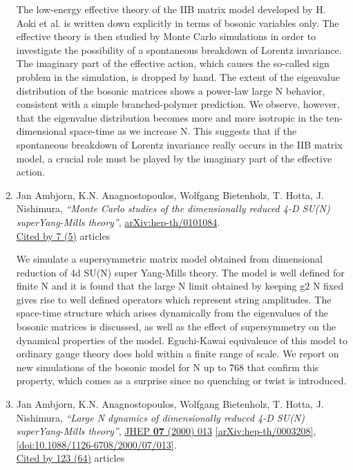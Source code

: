 \documentclass[a4paper,10pt]{article}
\begin{document}
\begin{enumerate}
The low-energy effective theory of the IIB matrix model developed by H. Aoki et al. is written down explicitly in terms of bosonic variables only. The effective theory is then studied by Monte Carlo simulations in order to investigate the possibility of a spontaneous breakdown of Lorentz invariance. The imaginary part of the effective action, which causes the so-called sign problem in the simulation, is dropped by hand. The extent of the eigenvalue distribution of the bosonic matrices shows a power-law large N behavior, consistent with a simple branched-polymer prediction. We observe, however, that the eigenvalue distribution becomes more and more isotropic in the ten-dimensional space-time as we increase N. This suggests that if the spontaneous breakdown of Lorentz invariance really occurs in the IIB matrix model, a crucial role must be played by the imaginary part of the effective action.
\item Jan Ambjorn, K.N. Anagnostopoulos, Wolfgang Bietenholz, T. Hotta, J. Nishimura, {\it ``Monte Carlo studies of the dimensionally reduced 4-D SU(N) superYang-Mills theory''}, \href{https://arxiv.org/abs/hep-th/0101084}{arXiv:hep-th/0101084}.
\\\href{https://inspirehep.net/literature/?q=refersto%3Arecid%3A539882}{Cited by 7 (5)} articles

We simulate a supersymmetric matrix model obtained from dimensional reduction of 4d SU(N) super Yang-Mills theory. The model is well defined for finite N and it is found that the large N limit obtained by keeping g2 N fixed gives rise to well defined operators which represent string amplitudes. The space-time structure which arises dynamically from the eigenvalues of the bosonic matrices is discussed, as well as the effect of supersymmetry on the dynamical properties of the model. Eguchi-Kawai equivalence of this model to ordinary gauge theory does hold within a finite range of scale. We report on new simulations of the bosonic model for N up to 768 that confirm this property, which comes as a surprise since no quenching or twist is introduced.
\item Jan Ambjorn, K.N. Anagnostopoulos, Wolfgang Bietenholz, T. Hotta, J. Nishimura, {\it ``Large N dynamics of dimensionally reduced 4-D SU(N) superYang-Mills theory''}, \href{https://www.doi.org/10.1088/1126-6708/2000/07/013}{JHEP {\bf 07} (2000) 013} \href{https://arxiv.org/abs/hep-th/0003208}{[arXiv:hep-th/0003208]}, \href{https://www.doi.org/10.1088/1126-6708/2000/07/013}{[doi:10.1088/1126-6708/2000/07/013]}.
\\\href{https://inspirehep.net/literature/?q=refersto%3Arecid%3A525317}{Cited by 123 (64)} articles


\end{enumerate}
\end{document}
